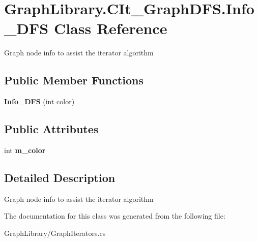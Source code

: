 \hypertarget{class_graph_library_1_1_c_it___graph_d_f_s_1_1_info___d_f_s}{}\section{Graph\+Library.\+C\+It\+\_\+\+Graph\+D\+F\+S.\+Info\+\_\+\+D\+F\+S Class Reference}
\label{class_graph_library_1_1_c_it___graph_d_f_s_1_1_info___d_f_s}


Graph node info to assist the iterator algorithm  


\subsection*{Public Member Functions}
\begin{DoxyCompactItemize}
\item 
\hypertarget{class_graph_library_1_1_c_it___graph_d_f_s_1_1_info___d_f_s_ad028855e94bd2879809038ddf744120c}{}{\bfseries Info\+\_\+\+D\+F\+S} (int color)\label{class_graph_library_1_1_c_it___graph_d_f_s_1_1_info___d_f_s_ad028855e94bd2879809038ddf744120c}

\end{DoxyCompactItemize}
\subsection*{Public Attributes}
\begin{DoxyCompactItemize}
\item 
\hypertarget{class_graph_library_1_1_c_it___graph_d_f_s_1_1_info___d_f_s_a6107e582274d18723815dd6b9242c5af}{}int {\bfseries m\+\_\+color}\label{class_graph_library_1_1_c_it___graph_d_f_s_1_1_info___d_f_s_a6107e582274d18723815dd6b9242c5af}

\end{DoxyCompactItemize}


\subsection{Detailed Description}
Graph node info to assist the iterator algorithm 



The documentation for this class was generated from the following file\+:\begin{DoxyCompactItemize}
\item 
Graph\+Library/Graph\+Iterators.\+cs\end{DoxyCompactItemize}
